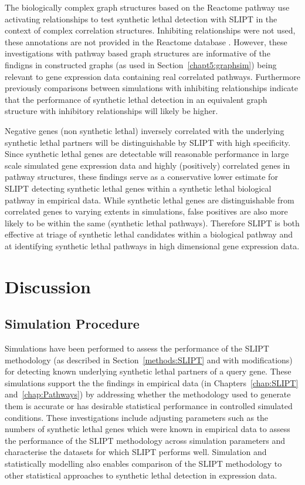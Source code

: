 The biologically complex graph structures based on the Reactome pathway use activating relationships to test synthetic lethal detection with \gls{SLIPT} in the context of complex correlation structures. Inhibiting relationships were not used, these annotations are not provided in the Reactome database \citep{Reactome}. However, these investigations with pathway based graph structures are informative of the findigns in constructed graphs (as used in Section~\ref{chapt5:graphsim}) being relevant to gene expression data containing real correlated pathways. Furthermore previously comparisons between simulations with inhibiting relationships indicate that the performance of synthetic lethal detection in an equivalent graph structure with inhibitory relationships will likely be higher.

Negative genes (non synthetic lethal) inversely correlated with the underlying synthetic lethal partners will be distinguishable by \gls{SLIPT} with high specificity. Since synthetic lethal genes are detectable will reasonable performance in large scale simulated gene expression data and highly (positively) correlated genes in pathway structures, these findings serve as a conservative lower estimate for \gls{SLIPT} detecting synthetic lethal genes within a synthetic lethal biological pathway in empirical data. While synthetic lethal genes are distinguishable from correlated genes to varying extents in simulations, false positives are also more likely to be within the same (synthetic lethal pathways). Therefore \gls{SLIPT} is both effective at triage of synthetic lethal candidates within a biological pathway and at identifying synthetic lethal pathways in high dimensional gene expression data.

\FloatBarrier

\section{Discussion}

\subsection{Simulation Procedure}

Simulations have been performed to assess the performance of the \gls{SLIPT} methodology (as described in Section~\ref{methods:SLIPT} and with modifications) for detecting known underlying synthetic lethal partners of a query gene. These simulations support the the findings in empirical data (in Chapters~\ref{chap:SLIPT} and~\ref{chap:Pathways}) by addressing whether the methodology used to generate them is accurate or has desirable statistical performance in controlled simulated conditions. These investigations include adjusting parameters such as the numbers of synthetic lethal genes which were known in empirical data to assess the performance of the \gls{SLIPT} methodology across simulation parameters and characterise the datasets for which \gls{SLIPT} performs well. Simulation and statistically modelling also enables comparison of the \gls{SLIPT} methodology to other statistical approaches to synthetic lethal detection in expression data.

